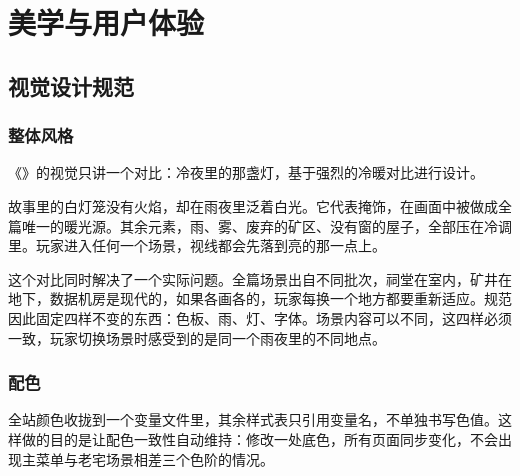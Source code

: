%
%
%

\chapter{美学与用户体验}

\section{视觉设计规范}

\subsection{整体风格}

《\ProjectName》的视觉只讲一个对比：冷夜里的那盏灯，基于强烈的冷暖对比进行设计。

故事里的白灯笼没有火焰，却在雨夜里泛着白光。它代表掩饰，在画面中被做成全篇唯一的暖光源。其余元素，雨、雾、废弃的矿区、没有窗的屋子，全部压在冷调里。玩家进入任何一个场景，视线都会先落到亮的那一点上。

这个对比同时解决了一个实际问题。全篇场景出自不同批次，祠堂在室内，矿井在地下，数据机房是现代的，如果各画各的，玩家每换一个地方都要重新适应。规范因此固定四样不变的东西：色板、雨、灯、字体。场景内容可以不同，这四样必须一致，玩家切换场景时感受到的是同一个雨夜里的不同地点。

\subsection{配色}

全站颜色收拢到一个变量文件里，其余样式表只引用变量名，不单独书写色值。这样做的目的是让配色一致性自动维持：修改一处底色，所有页面同步变化，不会出现主菜单与老宅场景相差三个色阶的情况。

